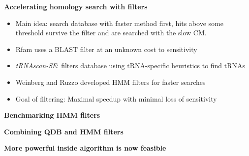 \documentclass[landscape]{slides}
\begin{document}
\begin{slide}
\large
\begin{center}
\textbf{Accelerating homology search with filters}
\end{center}

\small
\begin{itemize}
\item
  Main idea: search database with faster method first, hits above some threshold survive the filter and are searched with the slow CM.
\item
  Rfam uses a BLAST filter at an unknown cost to sensitivity
\item
  \emph{tRNAscan-SE}: filters database using tRNA-specific heuristics to find tRNAs
\item
  Weinberg and Ruzzo developed HMM filters for faster searches
\item
  Goal of filtering: Maximal speedup with minimal loss of sensitivity
\end{itemize}

\vfill

\end{slide}
\begin{slide}
\large
\begin{center}
\textbf{Benchmarking HMM filters}
\end{center}


\vfill

\end{slide}
\begin{slide}
\large
\begin{center}
\textbf{Combining QDB and HMM filters}
\end{center}


\vfill

\end{slide}
\begin{slide}
\large
\begin{center}
\textbf{More powerful inside algorithm is now feasible}
\end{center}


\vfill

\end{slide}
\end{document}

